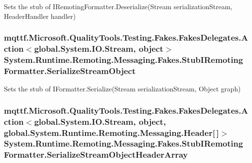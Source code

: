 Sets the stub of I\-Remoting\-Formatter.\-Deserialize(\-Stream serialization\-Stream, Header\-Handler handler)

\hypertarget{class_system_1_1_runtime_1_1_remoting_1_1_messaging_1_1_fakes_1_1_stub_i_remoting_formatter_a1c2621a1e4b7874a2c8f239988589202}{
\subsubsection[{Serialize\-Stream\-Object}]{\setlength{\rightskip}{0pt plus 5cm}mqttf.\-Microsoft.\-Quality\-Tools.\-Testing.\-Fakes.\-Fakes\-Delegates.\-Action$<$global.\-System.\-I\-O.\-Stream, object$>$ System.\-Runtime.\-Remoting.\-Messaging.\-Fakes.\-Stub\-I\-Remoting\-Formatter.\-Serialize\-Stream\-Object}}\label{class_system_1_1_runtime_1_1_remoting_1_1_messaging_1_1_fakes_1_1_stub_i_remoting_formatter_a1c2621a1e4b7874a2c8f239988589202}


Sets the stub of I\-Formatter.\-Serialize(\-Stream serialization\-Stream, Object graph)

\hypertarget{class_system_1_1_runtime_1_1_remoting_1_1_messaging_1_1_fakes_1_1_stub_i_remoting_formatter_a0386f0174caf8bb692e2b29a7c22d496}{
\subsubsection[{Serialize\-Stream\-Object\-Header\-Array}]{\setlength{\rightskip}{0pt plus 5cm}mqttf.\-Microsoft.\-Quality\-Tools.\-Testing.\-Fakes.\-Fakes\-Delegates.\-Action$<$global.\-System.\-I\-O.\-Stream, object, global.\-System.\-Runtime.\-Remoting.\-Messaging.\-Header\mbox{[}$\,$\mbox{]}$>$ System.\-Runtime.\-Remoting.\-Messaging.\-Fakes.\-Stub\-I\-Remoting\-Formatter.\-Serialize\-Stream\-Object\-Header\-Array}}\label{class_system_1_1_runtime_1_1_remoting_1_1_messaging_1_1_fakes_1_1_stub_i_remoting_formatter_a0386f0174caf8bb692e2b29a7c22d496}


